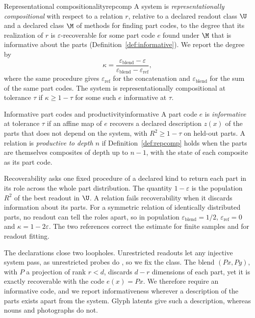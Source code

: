 \begin{defbox}{Representational compositionality}{repcomp}
A system is \emph{representationally compositional} with respect to a relation $r$, relative to a declared readout class $\U$ and a declared class $\M$ of methods for finding part codes, to the degree that its realization of $r$ is $\varepsilon$-recoverable for some part code $e$ found under $\M$ that is informative about the parts (Definition~\ref{def:informative}). We report the degree by
\begin{equation}
  \kappa = \frac{\varepsilon_{\mathrm{blend}} - \varepsilon}{\varepsilon_{\mathrm{blend}} - \varepsilon_{\mathrm{ref}}},
  \label{eq:kappa}
\end{equation}
where the same procedure gives $\varepsilon_{\mathrm{ref}}$ for the concatenation and $\varepsilon_{\mathrm{blend}}$ for the sum of the same part codes. The system is representationally compositional at tolerance $\tau$ if $\kappa \ge 1 - \tau$ for some such $e$ informative at $\tau$.
\end{defbox}

\begin{defbox}{Informative part codes and productivity}{informative}
A part code $e$ is \emph{informative} at tolerance $\tau$ if an affine map of $e$ recovers a declared description $z(x)$ of the parts that does not depend on the system, with $R^2 \ge 1 - \tau$ on held-out parts. A relation is \emph{productive to depth $n$} if Definition~\ref{def:repcomp} holds when the parts are themselves composites of depth up to $n - 1$, with the state of each composite as its part code.
\end{defbox}

Recoverability asks one fixed procedure of a declared kind to return each part in its role across the whole part distribution. The quantity $1 - \varepsilon$ is the population $R^2$ of the best readout in $\U$. A relation fails recoverability when it discards information about its parts. For a symmetric relation of identically distributed parts, no readout can tell the roles apart, so in population $\varepsilon_{\mathrm{blend}} = 1/2$, $\varepsilon_{\mathrm{ref}} = 0$ and $\kappa = 1 - 2\varepsilon$. The two references correct the estimate for finite samples and for readout fitting.

The declarations close two loopholes. Unrestricted readouts let any injective system pass, as unrestricted probes do \citep{hewitt2019}, so we fix the class. The blend $(Px, Py)$, with $P$ a projection of rank $r < d$, discards $d - r$ dimensions of each part, yet it is exactly recoverable with the code $e(x) = Px$. We therefore require an informative code, and we report informativeness wherever a description of the parts exists apart from the system. Glyph latents give such a description, whereas nouns and photographs do not.

